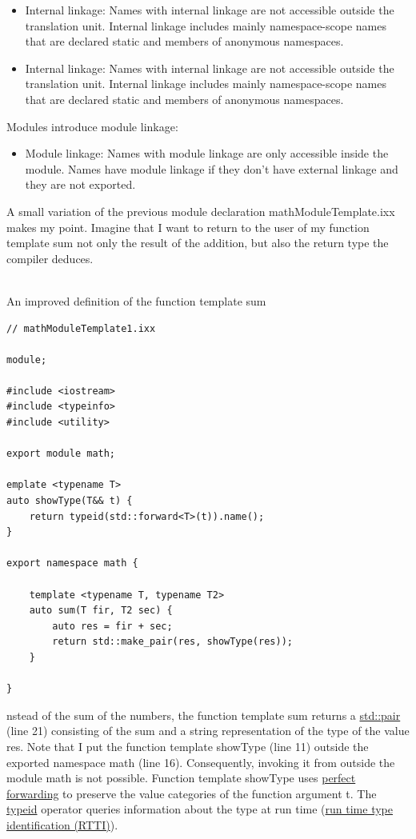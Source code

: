 \begin{itemize}
\item 
Internal linkage: Names with internal linkage are not accessible outside the translation unit. Internal linkage includes mainly namespace-scope names that are declared static and members of anonymous namespaces.

\item 
Internal linkage: Names with internal linkage are not accessible outside the translation unit. Internal linkage includes mainly namespace-scope names that are declared static and members of anonymous namespaces.
\end{itemize}

Modules introduce module linkage:

\begin{itemize}
\item 
Module linkage: Names with module linkage are only accessible inside the module. Names have module linkage if they don’t have external linkage and they are not exported.
\end{itemize}

A small variation of the previous module declaration mathModuleTemplate.ixx makes my point. Imagine that I want to return to the user of my function template sum not only the result of the addition, but also the return type the compiler deduces.

\hspace*{\fill} \\ %
\noindent
An improved definition of the function template sum
\begin{lstlisting}[style=styleCXX]
// mathModuleTemplate1.ixx

module;

#include <iostream>
#include <typeinfo>
#include <utility>

export module math;

emplate <typename T>
auto showType(T&& t) {
	return typeid(std::forward<T>(t)).name();
}

export namespace math {

	template <typename T, typename T2>
	auto sum(T fir, T2 sec) {
		auto res = fir + sec;
		return std::make_pair(res, showType(res));
	}

}
\end{lstlisting}

nstead of the sum of the numbers, the function template sum returns a \href{https://en.cppreference.com/w/cpp/utility/pair}{std::pair} (line 21) consisting of the sum and a string representation of the type of the value res. Note that I put the function template showType (line 11) outside the exported namespace math (line 16). Consequently, invoking it from outside the module math is not possible. Function template showType uses \href{https://www.modernescpp.com/index.php/perfect-forwarding}{perfect forwarding} to preserve the value categories of the function argument t. The \href{https://en.cppreference.com/w/cpp/language/typeid}{typeid} operator queries information about the type at run time (\href{https://en.cppreference.com/w/cpp/types}{run time type identification (RTTI)}).

